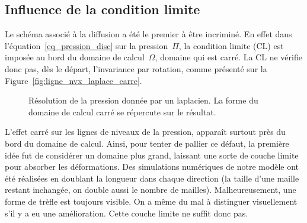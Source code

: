 \documentclass[main.tex]{subfiles}
\begin{document}
\subsection{Influence de la condition limite}
Le schéma associé à la diffusion a été le premier à être incriminé. En effet dans l'équation~\eqref{eq_pression_disc} sur la pression~$\Pi$, la condition limite (CL) est imposée au bord du domaine de calcul~$\Omega$, domaine qui est carré. La CL ne vérifie donc pas, dès le départ, l'invariance par rotation, comme présenté sur la Figure~\ref{fig:ligne_nvx_laplace_carre}.  %
\begin{figure}
\centering
{}
\caption{\label{fig:ligne_nvx_laplace} Résolution de la pression donnée par un laplacien. La forme du domaine de calcul carré se répercute sur le résultat.}
\end{figure} 
L'effet carré sur les lignes de niveaux de la pression, apparaît surtout près du bord du domaine de calcul. Ainsi, pour tenter de pallier ce défaut, la première idée fut de considérer un domaine plus grand, laissant une sorte de couche limite pour absorber les déformations. Des simulations numériques de notre modèle ont été réalisées en doublant la longueur dans chaque direction (la taille d'une maille restant inchangée, on double aussi le nombre de mailles). Malheureusement, une forme de trèfle est toujours visible. On a même du mal à distinguer visuellement s'il y a eu une amélioration. 
Cette couche limite ne suffit donc pas. 
\end{document}
